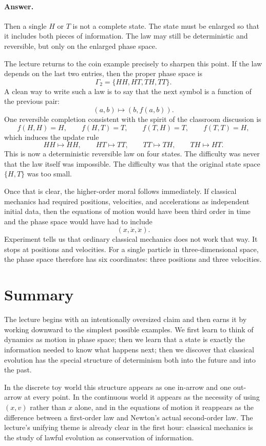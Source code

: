 \paragraph{Answer.} Then a single \(H\) or \(T\) is not a complete state. The state must be enlarged so that it includes both pieces of information. The law may still be deterministic and reversible, but only on the enlarged phase space.

The lecture returns to the coin example precisely to sharpen this point. If the law depends on the last two entries, then the proper phase space is
\begin{equation}
\Gamma_2=\{HH,HT,TH,TT\}.
\end{equation}
A clean way to write such a law is to say that the next symbol is a function of the previous pair:
\[
(a,b)\mapsto (b,f(a,b)).
\]
One reversible completion consistent with the spirit of the classroom discussion is
\[
f(H,H)=H,\qquad f(H,T)=T,\qquad f(T,H)=T,\qquad f(T,T)=H,
\]
which induces the update rule
\begin{equation}
HH\mapsto HH,\qquad
HT\mapsto TT,\qquad
TT\mapsto TH,\qquad
TH\mapsto HT.
\end{equation}
This is now a deterministic reversible law on four states. The difficulty was never that the law itself was impossible. The difficulty was that the original state space \(\{H,T\}\) was too small.

Once that is clear, the higher-order moral follows immediately. If classical mechanics had required positions, velocities, and accelerations as independent initial data, then the equations of motion would have been third order in time and the phase space would have had to include
\[
(x,\dot{x},\ddot{x}).
\]
Experiment tells us that ordinary classical mechanics does not work that way. It stops at positions and velocities. For a single particle in three-dimensional space, the phase space therefore has six coordinates: three positions and three velocities.

\section{Summary}

The lecture begins with an intentionally oversized claim and then earns it by working downward to the simplest possible examples. We first learn to think of dynamics as motion in phase space; then we learn that a state is exactly the information needed to know what happens next; then we discover that classical evolution has the special structure of determinism both into the future and into the past.

In the discrete toy world this structure appears as one in-arrow and one out-arrow at every point. In the continuous world it appears as the necessity of using \((x,v)\) rather than \(x\) alone, and in the equations of motion it reappears as the difference between a first-order law and Newton's actual second-order law. The lecture's unifying theme is already clear in the first hour: classical mechanics is the study of lawful evolution as conservation of information.